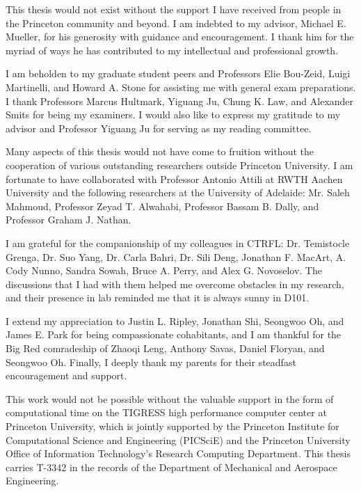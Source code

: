 This thesis would not exist without the support I have received from people in the Princeton community and beyond. I am indebted to my advisor, Michael E. Mueller, for his generosity with guidance and encouragement. I thank him for the myriad of ways he has contributed to my intellectual and professional growth.

I am beholden to my graduate student peers and Professors Elie Bou-Zeid, Luigi Martinelli, and Howard A. Stone for assisting me with general exam preparations. I thank Professors Marcus Hultmark, Yiguang Ju, Chung K. Law, and Alexander Smits for being my examiners. I would also like to express my gratitude to my advisor and Professor Yiguang Ju for serving as my reading committee.

Many aspects of this thesis would not have come to fruition without the cooperation of various outstanding researchers outside Princeton University. I am fortunate to have collaborated with Professor Antonio Attili at RWTH Aachen University and the following researchers at the University of Adelaide: Mr. Saleh Mahmoud, Professor Zeyad T. Alwahabi, Professor Bassam B. Dally, and Professor Graham J. Nathan.

I am grateful for the companionship of my colleagues in CTRFL: Dr. Temistocle Grenga, Dr. Suo Yang, Dr. Carla Bahri, Dr. Sili Deng, Jonathan F. MacArt, A. Cody Nunno, Sandra Sowah, Bruce A. Perry, and Alex G. Novoselov. The discussions that I had with them helped me overcome obstacles in my research, and their presence in lab reminded me that it is always sunny in D101.

I extend my appreciation to Justin L. Ripley, Jonathan Shi, Seongwoo Oh, and James E. Park for being compassionate cohabitants, and I am thankful for the Big Red comradeship of Zhaoqi Leng, Anthony Savas, Daniel Floryan, and Seongwoo Oh. Finally, I deeply thank my parents for their steadfast encouragement and support.

This work would not be possible without the valuable support in the form of computational time on the TIGRESS high performance computer center at Princeton University, which is jointly supported by the Princeton Institute for Computational Science and Engineering (PICSciE) and the Princeton University Office of Information Technology's Research Computing Department. This thesis carries T-3342 in the records of the Department of Mechanical and Aerospace Engineering.


